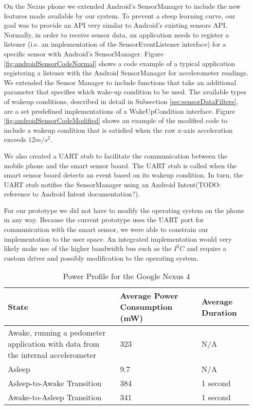 On the Nexus phone we extended Android's SensorManager to include the new features made available by our system. To prevent a steep learning curve, our goal was to provide an API very similar to Android's existing sensors API. Normally, in order to receive sensor data, an application needs to register a listener (i.e. an implementation of the SensorEventListener interface) for a specific sensor with Android's SensorManager. Figure \ref{fig:androidSensorCodeNormal} shows a code example of a typical application registering a listener with the Android SensorManager for accelerometer readings. We extended the Sensor Manager to include functions that take an additional parameter that specifies which wake-up condition to be used. The available types of wakeup conditions, described in detail in Subsection \ref{sec:sensorDataFilters}, are a set predefined implementations of a WakeUpCondition interface. Figure \ref{fig:androidSensorCodeModified} shows an example of the modified code to include a wakeup condition that is satisfied when the raw x-axis acceleration exceeds $12 m/s^2$.

We also created a UART stub to facilitate the communication between the mobile phone and the smart sensor board. The UART stub is called when the smart sensor board detects an event based on its wakeup condition. In turn, the UART stub notifies the SensorManager using an Android Intent(TODO: reference to Android Intent documentation?).

For our prototype we did not have to modify the operating system on the phone in any way. Because the current prototype uses the UART port for communication with the smart sensor, we were able to constrain our implementation to the user space. An integrated implementation would very likely make use of the higher bandwidth bus such as the $I^2C$ and require a custom driver and possibly modification to the operating system.

\begin{table*}[t]
	\begin{tabular}{| p{7cm} | l | l |}
		\hline
		State & Average Power Consumption (mW) & Average Duration \\ \hline
		Awake, running a pedometer application with data from the internal accelerometer & 323 & N/A \\ \hline
		Asleep & 9.7 & N/A \\ \hline
		Asleep-to-Awake Transition & 384 & 1 second \\ \hline
		Awake-to-Asleep Transition & 341 & 1 second \\ \hline
	\end{tabular}
	\caption{Power Profile for the Google Nexus 4}
	\label{table:powerProfileNexus}
\end{table*}


